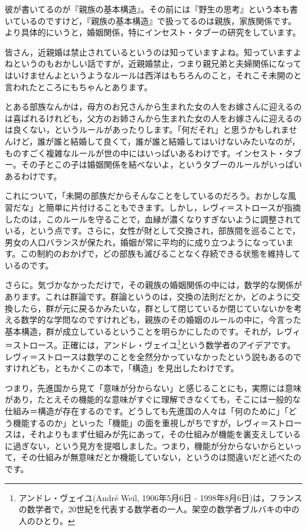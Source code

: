 \documentclass{ltjsbook}
\begin{document}
彼が書いてるのが『親族の基本構造』。その前には『野生の思考』という本も書いているのですけど，『親族の基本構造』で扱ってるのは親族，家族関係です。より具体的にいうと，婚姻関係，特にインセスト・タブーの研究をしています。

皆さん，近親婚は禁止されているというのは知っていますよね。知っていますよねというのもおかしい話ですが，近親婚禁止，つまり親兄弟と夫婦関係になってはいけませんよというようなルールは西洋はもちろんのこと，それこそ未開のと言われたところにもちゃんとあります。

とある部族なんかは，母方のお兄さんから生まれた女の人をお嫁さんに迎えるのは喜ばれるけれども，父方のお姉さんから生まれた女の人をお嫁さんに迎えるのは良くない，というルールがあったりします。「何だそれ」と思うかもしれませんけど，誰が誰と結婚して良くて，誰が誰と結婚してはいけないみたいなのが，ものすごく複雑なルールが世の中にはいっぱいあるわけです。インセスト・タブー。その子とこの子は婚姻関係を結べないよ，というタブーのルールがいっぱいあるわけです。

これについて，「未開の部族だからそんなことをしているのだろう。おかしな風習だな」と簡単に片付けることもできます。しかし，レヴィ＝ストロースが指摘したのは，このルールを守ることで，血縁が濃くなりすぎないように調整されている，という点です。さらに，女性が財として交換され，部族間を巡ることで，男女の人口バランスが保たれ，婚姻が常に平均的に成り立つようになっています。この制約のおかげで，どの部族も滅びることなく存続できる状態を維持しているのです。

さらに。気づかなかっただけで，その親族の婚姻関係の中には，数学的な関係があります。これは群論です。群論というのは，交換の法則だとか，どのように交換したら，群が元に戻るかみたいな，群として閉じているか閉じていないかを考える数学的な学問なのですけれども，親族のその婚姻のルールの中に，今言った基本構造，群が成立しているということを明らかにしたのです。それが，レヴィ＝ストロース。正確には，アンドレ・ヴェイユ\footnote{アンドレ・ヴェイユ(Andr\'{e} Weil, 1906年5月6日 - 1998年8月6日)は，フランスの数学者で，20世紀を代表する数学者の一人。架空の数学者ブルバキの中の人のひとり。}という数学者のアイデアです。レヴィ＝ストロースは数学のことを全然分かっていなかったという説もあるのですけれども，ともかくこの本で，「構造」を見出したわけです。

つまり，先進国から見て「意味が分からない」と感じることにも，実際には意味があり，たとえその機能的な意味がすぐに理解できなくても，そこには一般的な仕組み＝構造が存在するのです。どうしても先進国の人々は「何のために」「どう機能するのか」といった「機能」の面を重視しがちですが，レヴィ＝ストロースは，それよりもまず仕組みが先にあって，その仕組みが機能を裏支えしているに過ぎない，という見方を提唱しました。つまり，機能が分からないからといって，その仕組みが無意味だとか機能していない，というのは間違いだと述べたのです。
\end{document}
